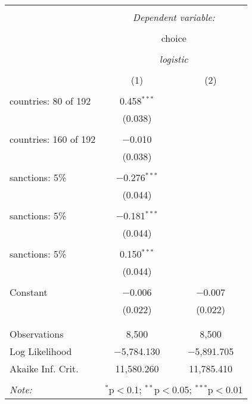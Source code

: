 
\begin{table}[!htbp] \centering 
  \caption{} 
  \label{tab:glm:null} 
\begin{tabular}{@{\extracolsep{5pt}}lcc} 
\\[-1.8ex]\hline 
\hline \\[-1.8ex] 
 & \multicolumn{2}{c}{\textit{Dependent variable:}} \\ 
\cline{2-3} 
\\[-1.8ex] & \multicolumn{2}{c}{choice} \\ 
\\[-1.8ex] & \multicolumn{2}{c}{\textit{logistic}} \\ 
\\[-1.8ex] & (1) & (2)\\ 
\hline \\[-1.8ex] 
 countries:  80 of 192 & 0.458$^{***}$ &  \\ 
  & (0.038) &  \\ 
  & & \\ 
 countries:  160 of 192 & $-$0.010 &  \\ 
  & (0.038) &  \\ 
  & & \\ 
 sanctions: 5\% & $-$0.276$^{***}$ &  \\ 
  & (0.044) &  \\ 
  & & \\ 
 sanctions: 5\% & $-$0.181$^{***}$ &  \\ 
  & (0.044) &  \\ 
  & & \\ 
 sanctions: 5\% & 0.150$^{***}$ &  \\ 
  & (0.044) &  \\ 
  & & \\ 
 Constant & $-$0.006 & $-$0.007 \\ 
  & (0.022) & (0.022) \\ 
  & & \\ 
\hline \\[-1.8ex] 
Observations & 8,500 & 8,500 \\ 
Log Likelihood & $-$5,784.130 & $-$5,891.705 \\ 
Akaike Inf. Crit. & 11,580.260 & 11,785.410 \\ 
\hline 
\hline \\[-1.8ex] 
\textit{Note:}  & \multicolumn{2}{r}{$^{*}$p$<$0.1; $^{**}$p$<$0.05; $^{***}$p$<$0.01} \\ 
\end{tabular} 
\end{table}  
